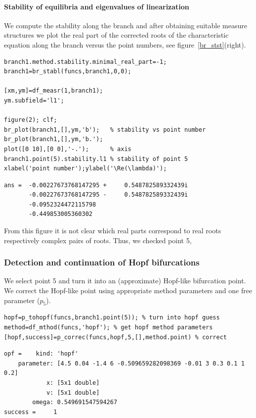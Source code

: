 \documentclass[10pt]{scrartcl}
\begin{document}
\paragraph{Stability of equilibria and eigenvalues of linearization}
We compute the stability along the branch and after obtaining suitable
measure structures we plot the real part of the corrected roots of the
characteristic equation along the branch versus the point numbers, see
figure~\ref{br_stst}(right).
\begin{lstlisting}
branch1.method.stability.minimal_real_part=-1;
branch1=br_stabl(funcs,branch1,0,0);

[xm,ym]=df_measr(1,branch1);
ym.subfield='l1';

figure(2); clf;
br_plot(branch1,[],ym,'b');   % stability vs point number
br_plot(branch1,[],ym,'b.');
plot([0 10],[0 0],'-.');      % axis
branch1.point(5).stability.l1 % stability of point 5
xlabel('point number');ylabel('\Re(\lambda)');  
\end{lstlisting}
{\small
\begin{verbatim}
ans =  -0.00227673768147295 +     0.548782589332439i
       -0.00227673768147295 -     0.548782589332439i
       -0.0952324472115798                         
       -0.449853005360302              
\end{verbatim}
}
From this figure it is not clear which real parts correspond 
to real roots respectively complex pairs of roots. Thus, we checked point 5,

\subsubsection{Detection and continuation of Hopf bifurcations}
\label{sec:sd:hopf}
We select point 5 and turn it into an (approximate) Hopf-like 
bifurcation point. We correct the Hopf-like point using appropriate method parameters
and one free parameter ($p_5$). 
\begin{lstlisting}
hopf=p_tohopf(funcs,branch1.point(5)); % turn into hopf guess
method=df_mthod(funcs,'hopf'); % get hopf method parameters
[hopf,success]=p_correc(funcs,hopf,5,[],method.point) % correct
\end{lstlisting}
{\small
\begin{verbatim}
opf =    kind: 'hopf'
    parameter: [4.5 0.04 -1.4 6 -0.509659282098369 -0.01 3 0.3 0.1 1 0.2]
            x: [5x1 double]
            v: [5x1 double]
        omega: 0.549691547594267
success =     1
\end{verbatim}}
\end{document}
